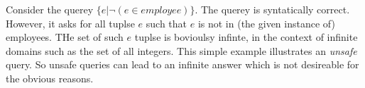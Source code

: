 \begin{exercise}{10}
\begin{subexercise}
\end{subexercise}

\begin{subexercise}
  Consider the querey $\{e | \neg ( e \in employee)\}$. The querey is syntatically correct.
  However, it asks for all tuplse $e$ such that $e$ is not in (the given
  instance of) employees. THe set of such $e$ tuplse is bovioulsy infinte, in
  the context of infinite domains such as the set of all integers. This simple
  example illustrates an \emph{unsafe} query. So unsafe queries can lead to an
  infinite answer which is not desireable for the obvious reasons.
\end{subexercise}

\end{exercise}
